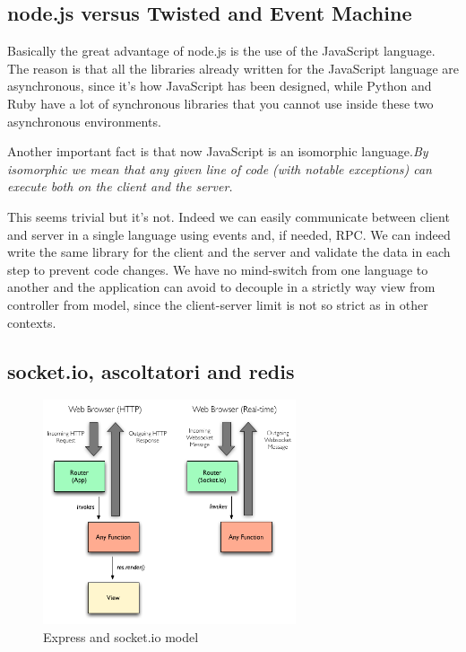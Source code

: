 \subsection{node.js versus Twisted and Event Machine}

Basically the great advantage of node.js is the use of the JavaScript language. The reason is that all the libraries already written for the JavaScript language are asynchronous, since it's how JavaScript has been designed, while Python and Ruby have a lot of synchronous libraries that you cannot use inside these two asynchronous environments.

Another important fact is that now JavaScript is an isomorphic language.\textit{By isomorphic we mean that any given line of code (with notable exceptions) can execute both on the client and the server.}\cite{website:isomorfic}

This seems trivial but it's not. Indeed we can easily communicate between client and server in a single language using events and, if needed, RPC. We can indeed write the same library for the client and the server and validate the data in each step to prevent code changes. We have no mind-switch from one language to another and the application can avoid to decouple in a strictly way view from controller from model, since the client-server limit is not so strict as in other contexts.

\subsection{socket.io, ascoltatori and redis}

\begin{figure}[H]
\centering %
\includegraphics[height=250px]{img/express.png}
\caption{Express and socket.io model}
\label{fig:expressSocketio}
\end{figure}

